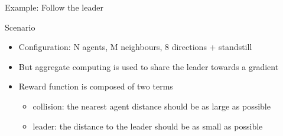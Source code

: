 \documentclass[presentation, 8pt]{beamer}\mode<presentation>{\usetheme{AMSBolognaFC}}
\begin{document}
\begin{frame}{Example: Follow the leader}
\begin{exampleblock}{Scenario}
	\begin{itemize}
		\item Configuration: N agents, M neighbours, 8 directions + standstill
		\item But aggregate computing is used to share the leader towards a gradient
		\item Reward function is composed of two terms
		\begin{itemize}
			\item collision: the nearest agent distance should be as large as possible 
			\item leader: the distance to the leader should be as small as possible
		\end{itemize}
	\end{itemize}

\end{exampleblock}
\end{frame}
\end{document}
